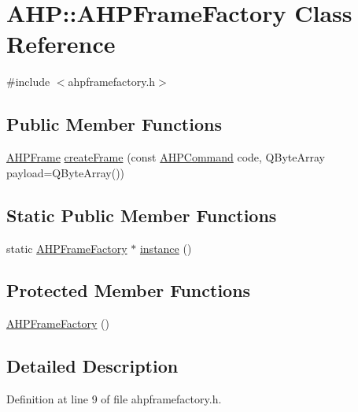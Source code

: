 \hypertarget{class_a_h_p_1_1_a_h_p_frame_factory}{}\section{A\+H\+P\+:\+:A\+H\+P\+Frame\+Factory Class Reference}
\label{class_a_h_p_1_1_a_h_p_frame_factory}


{\ttfamily \#include $<$ahpframefactory.\+h$>$}

\subsection*{Public Member Functions}
\begin{DoxyCompactItemize}
\item 
\hyperlink{class_a_h_p_1_1_a_h_p_frame}{A\+H\+P\+Frame} \hyperlink{class_a_h_p_1_1_a_h_p_frame_factory_a02b823d56bfaf99b8069867f3eafec9c}{create\+Frame} (const \hyperlink{namespace_a_h_p_ac6dabdee20c9d5b492f2578a36e04f51}{A\+H\+P\+Command} code, Q\+Byte\+Array payload=Q\+Byte\+Array())
\end{DoxyCompactItemize}
\subsection*{Static Public Member Functions}
\begin{DoxyCompactItemize}
\item 
static \hyperlink{class_a_h_p_1_1_a_h_p_frame_factory}{A\+H\+P\+Frame\+Factory} $\ast$ \hyperlink{class_a_h_p_1_1_a_h_p_frame_factory_ae2bc68dc0dfa36eca9c75828774c1919}{instance} ()
\end{DoxyCompactItemize}
\subsection*{Protected Member Functions}
\begin{DoxyCompactItemize}
\item 
\hyperlink{class_a_h_p_1_1_a_h_p_frame_factory_a9d0d67b53960407413e04e839e061ae5}{A\+H\+P\+Frame\+Factory} ()
\end{DoxyCompactItemize}


\subsection{Detailed Description}


Definition at line 9 of file ahpframefactory.\+h.



